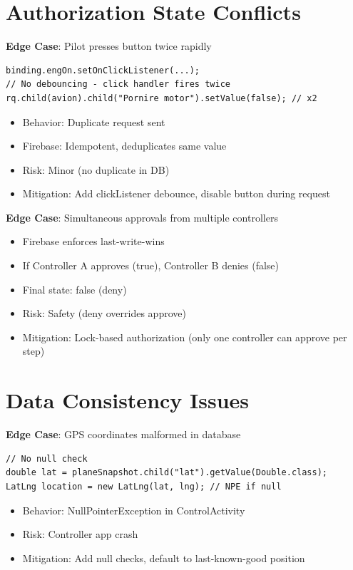 \documentclass[11pt,a4paper]{report}
\begin{document}
\section{Authorization State Conflicts}

\textbf{Edge Case}: Pilot presses button twice rapidly

\begin{lstlisting}
binding.engOn.setOnClickListener(...);
// No debouncing - click handler fires twice
rq.child(avion).child("Pornire motor").setValue(false); // x2
\end{lstlisting}

\begin{itemize}
    \item Behavior: Duplicate request sent
    \item Firebase: Idempotent, deduplicates same value
    \item Risk: Minor (no duplicate in DB)
    \item Mitigation: Add clickListener debounce, disable button during request
\end{itemize}

\textbf{Edge Case}: Simultaneous approvals from multiple controllers

\begin{itemize}
    \item Firebase enforces last-write-wins
    \item If Controller A approves (true), Controller B denies (false)
    \item Final state: false (deny)
    \item Risk: Safety (deny overrides approve)
    \item Mitigation: Lock-based authorization (only one controller can approve per step)
\end{itemize}

\section{Data Consistency Issues}

\textbf{Edge Case}: GPS coordinates malformed in database

\begin{lstlisting}
// No null check
double lat = planeSnapshot.child("lat").getValue(Double.class);
LatLng location = new LatLng(lat, lng); // NPE if null
\end{lstlisting}

\begin{itemize}
    \item Behavior: NullPointerException in ControlActivity
    \item Risk: Controller app crash
    \item Mitigation: Add null checks, default to last-known-good position
\end{itemize}
\end{document}
